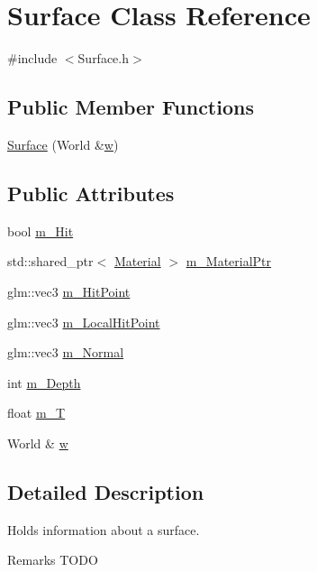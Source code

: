 \hypertarget{class_surface}{}\section{Surface Class Reference}
\label{class_surface}


{\ttfamily \#include $<$Surface.\+h$>$}

\subsection*{Public Member Functions}
\begin{DoxyCompactItemize}
\item 
\hyperlink{class_surface_a09333b09d58a9c1a23903c5bc21ba425}{Surface} (World \&\hyperlink{class_surface_adc3a6c73b06a4eebb40cc9083d6a956b}{w})
\end{DoxyCompactItemize}
\subsection*{Public Attributes}
\begin{DoxyCompactItemize}
\item 
bool \hyperlink{class_surface_a5fcd1d25c1f67289f4167242c685693c}{m\+\_\+\+Hit}
\item 
std\+::shared\+\_\+ptr$<$ \hyperlink{class_material}{Material} $>$ \hyperlink{class_surface_ac9c3eaa9f8870efbe4cd9e79e28b21e1}{m\+\_\+\+Material\+Ptr}
\item 
glm\+::vec3 \hyperlink{class_surface_ab3cf728434195ae6b569604d90b05bcd}{m\+\_\+\+Hit\+Point}
\item 
glm\+::vec3 \hyperlink{class_surface_ab914f3e5804e0043a140b892e32ab3e7}{m\+\_\+\+Local\+Hit\+Point}
\item 
glm\+::vec3 \hyperlink{class_surface_aa4ae3fc7afb6da10d48beb2bd0590a48}{m\+\_\+\+Normal}
\item 
int \hyperlink{class_surface_a07d2132be1f81e87f7a8d6228e2457c1}{m\+\_\+\+Depth}
\item 
float \hyperlink{class_surface_a19719f48b9ee4fb2a78ef277289f0321}{m\+\_\+T}
\item 
World \& \hyperlink{class_surface_adc3a6c73b06a4eebb40cc9083d6a956b}{w}
\end{DoxyCompactItemize}


\subsection{Detailed Description}
Holds information about a surface. \begin{DoxyRemark}{Remarks}
T\+O\+DO 
\end{DoxyRemark}


